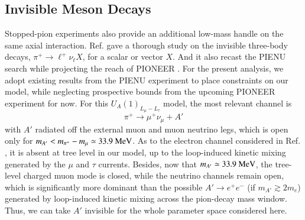\documentclass[onecolumn, aps, nofootinbib, prd, preprint, floats, floatfix, amsmath, amssymb, superscriptaddress, preprintnumbers]{revtex4-2}
\begin{document}
\subsection{Invisible Meson Decays}
\label{subsec:pion-invisible}

Stopped-pion experiments also provide an additional low-mass handle on the same axial interaction. Ref. \cite{Altmannshofer:2026opc} gave a thorough study on the invisible three-body decays, $\pi^+\to \ell^+\nu_\ell X$, for a scalar or vector $X$. And it also recast the PIENU search \cite{PIENU:2021clt} while projecting the reach of PIONEER \cite{PIONEER:2022yag,PIONEER:2022alm}. For the present analysis, we adopt existing results from the PIENU experiment to place constraints on our model, while neglecting prospective bounds from the upcoming PIONEER experiment for now. For this $U_A(1)_{L_\mu-L_\tau}$ model, the most relevant channel is
\begin{equation}
    \pi^+\to \mu^+ \nu_\mu +A'
\end{equation}
with $A'$ radiated off the external muon and muon neutrino legs, which is open only for $m_{A'}<m_{\pi^+}-m_\mu\simeq33.9~{\rm MeV}$. As to the electron channel considered in Ref. \cite{Altmannshofer:2026opc}, it is absent at tree level in our model, up to the loop-induced kinetic mixing generated by the $\mu$ and $\tau$ currents. Besides, now that $m_{A'}\simeq33.9~{\rm MeV}$, the tree-level charged muon mode is closed, while the neutrino channels remain open, which is significantly more dominant than the possible $A'\to e^+e^-$ (if $m_{A'}\gtrsim 2m_e$) generated by loop-induced kinetic mixing across the pion-decay mass window. Thus, we can take $A'$ invisible for the whole parameter space considered here.
\end{document}
